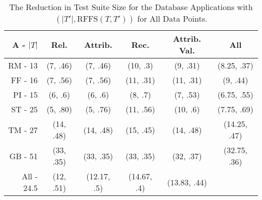 \vspace*{-.25in}

\begin{table}[h]

\begin{center}

\begin{tabular}{r || c | c | c | c || c} 

  {\bf A - $|T|$} & {\bf Rel.} & {\bf Attrib.} & {\bf Rec.} & 
    {\bf Attrib. Val.} & {\bf All} \\ \hline \hline

  RM - 13  &  (7, .46)   &  (7, .46)  
                 &  (10, .3)     &  (9, .31) & 
                 (8.25, .37) \\ \hline

  FF - 16  &  (7, .56)      &  (7, .56)  
                 &  (11, .31)     &  (11, .31) & 
                 (9, .44) \\ \hline

  PI - 15  &  (6, .6)         &  (6, .6)  
                 &  (8, .7)         &  (7, .53) & 
                 (6.75, .55) \\ \hline

  ST - 25 &  (5, .80)         &  (5, .76)  
                 &  (11, .56)       &  (10, .6) & 
                 (7.75, .69) \\ \hline

  TM - 27 &  (14, .48)      &  (14, .48)  
                 &  (15, .45)      &  (14, .48) & 
                 (14.25, .47) \\ \hline

  GB - 51  &  (33, .35)      &  (33, .35)  
                 &  (33, .35)      &  (32, .37) & 
                 (32.75, .36) 
                 \\ \hline \hline

                 {All} - 24.5  &  (12, .51)           &  (12.17, .5)  
                    &  (14.67, .4)      &  (13.83, .44) & 
 
\end{tabular} 

\end{center}

\caption{The Reduction in Test Suite Size for the Database
  Applications with $(|T'|, \mbox{RFFS}(T, T'))$ for All Data Points.}
\label{fig:reductions}
\vspace*{-.1in}

\end{table}
